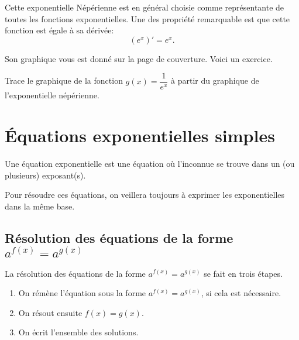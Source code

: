 \documentclass[a4paper,12pt,singlepage]{report}
\begin{document}
Cette exponentielle Népérienne est en général choisie comme représentante de
toutes les fonctions exponentielles. Une des propriété remarquable est que cette
fonction est égale à sa dérivée:
\[
(e^x)'=e^x.
\]

Son graphique vous est donné sur la page de couverture. Voici un exercice.
\begin{exercice}
Trace le graphique de la fonction \(g(x)= \dfrac{1}{e^x}\) à partir du graphique
de l'exponentielle népérienne.

\begin{center}

\end{center}
\end{exercice}

\newpage
\section{Équations exponentielles simples}
\label{sec:org09a1769}
Une équation exponentielle est une équation où l’inconnue se trouve dans un (ou
plusieurs) exposant(s).

Pour résoudre ces équations, on veillera toujours à exprimer les exponentielles
dans la même base.
\subsection{Résolution des équations de la forme \(a^{f(x)}=a^{g(x)}\)}
\label{sec:org054e06a}
La résolution des équations de la forme  \(a^{f(x)}=a^{g(x)}\) se fait en trois
étapes.

\begin{enumerate}
\item On rémène l'équation sous la forme \(a^{f(x)}=a^{g(x)}\), si cela est
nécessaire.
\item On résout ensuite \(f(x)=g(x)\).
\item On écrit l'ensemble des solutions.
\end{enumerate}
\end{document}
